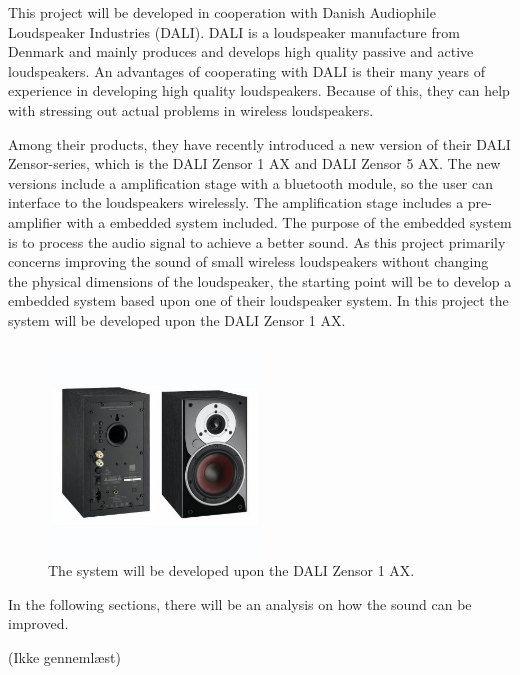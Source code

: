 This project will be developed in cooperation with Danish Audiophile Loudspeaker Industries (DALI). DALI is a loudspeaker manufacture from Denmark and mainly produces and develops high quality passive and active loudspeakers. An advantages of cooperating with DALI is their many years of experience in developing high quality loudspeakers. Because of this, they can help with stressing out actual problems in wireless loudspeakers.

Among their products, they have recently introduced a new version of their DALI Zensor-series, which is the DALI Zensor 1 AX and DALI Zensor 5 AX. The  new versions include a amplification stage with a bluetooth module, so the user can interface to the loudspeakers wirelessly. The amplification stage includes a pre-amplifier with a embedded system included. The purpose of the embedded system is to process the audio signal to achieve a better sound.
As this project primarily concerns improving the sound of small wireless loudspeakers without changing the physical dimensions of the loudspeaker, the starting point will be to develop a embedded system based upon one of their loudspeaker system. In this project the system will be developed upon the DALI Zensor 1 AX.

\begin{figure}[H]
\centering
\includegraphics[width=0.5\textwidth]{figures/dali_zensor_1_ax.jpg}
\caption{The system will be developed upon the DALI Zensor 1 AX.}
\label{fig:dali_zensor}
\end{figure}

In the following sections, there will be an analysis on how the sound can be improved.

(Ikke gennemlæst)






